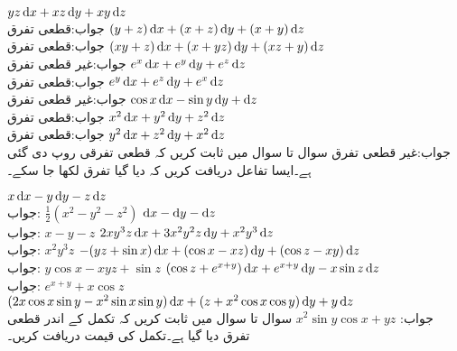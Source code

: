 \quad
$yz\dif x+xz\dif y+xy\dif z$\\
جواب:\quad قطعی تفرق
\quad
$(y+z)\dif x+(x+z)\dif y+(x+y)\dif z$\\
جواب:\quad قطعی تفرق
\quad
$(xy+z)\dif x+(x+yz)\dif y+(xz+y)\dif z$\\
جواب:\quad غیر قطعی تفرق
\quad
$e^x\dif x+e^y\dif y+e^z\dif z$\\
جواب:\quad قطعی تفرق
\quad
$e^y\dif x+e^z\dif y+e^x\dif z$\\
جواب:\quad غیر قطعی تفرق
\quad
$\cos x\dif x-\sin y\dif y+\dif z$\\
جواب:\quad قطعی تفرق
\quad
$x^2\dif x+y^2\dif y+z^2\dif z$\\
جواب:\quad قطعی تفرق
\quad
$y^2\dif x+z^2\dif y+x^2\dif z$\\
جواب:\quad غیر قطعی تفرق
سوال  تا سوال  میں ثابت کریں کہ قطعی تفرقی روپ دی گئی ہے۔ایسا تفاعل  دریافت کریں کہ دیا گیا تفرق  لکھا جا سکے۔

\quad
$x\dif x-y\dif y-z\dif z$\\
جواب:\quad
$\tfrac{1}{2}(x^2-y^2-z^2)$
\quad
$\dif x-\dif y-\dif z$\\
جواب:\quad
$x-y-z$
\quad
$2xy^3z\dif x+3x^2y^2z\dif y+x^2y^3\dif z$\\
جواب:\quad
$x^2y^3z$
\quad
$-(yz+\sin x)\dif x+(\cos x-xz)\dif y+(\cos z-xy)\dif z$\\
جواب:\quad
$y\cos x-xyz+\sin z$
\quad
$(\cos z+e^{x+y})\dif x+e^{x+y}\dif y-x\sin z\dif z$\\
جواب:\quad
$e^{x+y}+x\cos z$
\quad
$(2x\cos x\sin y-x^2\sin x\sin y)\dif x+(z+x^2\cos x\cos y)\dif y+y\dif z$\\
جواب:\quad
$x^2\sin y \cos x+yz$
سوال  تا سوال  میں ثابت کریں کہ تکمل کے اندر قطعی تفرق دیا گیا ہے۔تکمل کی قیمت دریافت کریں۔

